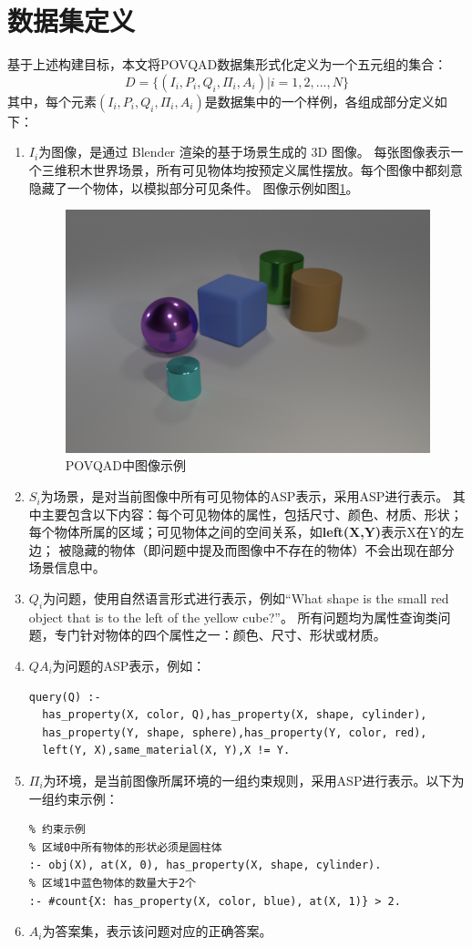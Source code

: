 \section{数据集定义}
基于上述构建目标，本文将POVQAD数据集形式化定义为一个五元组的集合：
$$D = \{ (I_i,P_i,Q_i,\Pi_i ,A_i) | i=1,2,...,N \}$$
其中，每个元素$(I_i,P_i,Q_i,\Pi_i ,A_i)$是数据集中的一个样例，各组成部分定义如下：
\begin{enumerate}[nosep]
\item \textbf{$I_i$}为图像，是通过 Blender 渲染的基于场景生成的 3D 图像。
每张图像表示一个三维积木世界场景，所有可见物体均按预定义属性摆放。每个图像中都刻意隐藏了一个物体，以模拟部分可见条件。
图像示例如图\ref{POVQAD-figure}。
\begin{figure}
\centering
\includegraphics[scale=0.6]{figures/POVQAD中图像示例.png}
\caption{POVQAD中图像示例}
\label{POVQAD-figure}
\end{figure}
\item \textbf{$S_i$}为场景，是对当前图像中所有可见物体的ASP表示，采用ASP进行表示。
其中主要包含以下内容：每个可见物体的属性，包括尺寸、颜色、材质、形状；每个物体所属的区域；可见物体之间的空间关系，如\textbf{left(X,Y)}表示X在Y的左边；
被隐藏的物体（即问题中提及而图像中不存在的物体）不会出现在部分场景信息中。
\item \textbf{$Q_i$}为问题，使用自然语言形式进行表示，例如“What shape is the small red object that is to the left of the yellow cube?”。
所有问题均为属性查询类问题，专门针对物体的四个属性之一：颜色、尺寸、形状或材质。
\item \textbf{$QA_i$}为问题的ASP表示，例如：
\begin{lstlisting}
query(Q) :-
  has_property(X, color, Q),has_property(X, shape, cylinder),
  has_property(Y, shape, sphere),has_property(Y, color, red),
  left(Y, X),same_material(X, Y),X != Y.
\end{lstlisting}
\item \textbf{$\Pi_i$}为环境，是当前图像所属环境的一组约束规则，采用ASP进行表示。以下为一组约束示例：
\begin{lstlisting}
% 约束示例
% 区域0中所有物体的形状必须是圆柱体
:- obj(X), at(X, 0), has_property(X, shape, cylinder).
% 区域1中蓝色物体的数量大于2个
:- #count{X: has_property(X, color, blue), at(X, 1)} > 2.
\end{lstlisting}
\item \textbf{$A_i$}为答案集，表示该问题对应的正确答案。
\end{enumerate}
